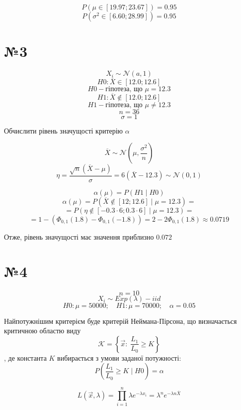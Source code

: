 \documentclass[11pt, a4paper]{article} %
\begin{document}
\begin{mdframed}[style=ans]
    $$P(\mu \in [19.97; 23.67]) = 0.95$$
    $$P(\sigma^2 \in [6.60; 28.99]) = 0.95$$
\end{mdframed}

\pagebreak

\section*{№3}

\begin{mdframed}
    $$X_i \sim \mathcal N (a,1)$$
    $$H0: \overline X \in [12.0; 12.6]$$
    $$H0 - \text{гіпотеза, що } \mu = 12.3$$
    $$H1: \overline X \notin [12.0; 12.6]$$
    $$H1 - \text{гіпотеза, що } \mu \ne 12.3$$
    $$n = 36$$
    $$\sigma = 1$$

    Обчислити рівень значущості критерію $\alpha$
\end{mdframed}

$$\overline X \sim \mathcal{N}(\mu, \frac{\sigma^2}{n})$$
$$\eta = \frac{\sqrt n (\overline X - \mu)}{\sigma} = 6(\overline X - 12.3) \sim \mathcal{N}(0,1)$$

$$\alpha(\mu) = P(H1 \;|\; H0)$$
$$\alpha(\mu) = P(\overline X \notin [12; 12.6] \; | \; \mu = 12.3) = $$
$$= P(\eta \notin [-0.3\cdot 6; 0.3 \cdot 6] \;|\; \mu = 12.3) = $$
$$= 1-\left(\Phi_{0,1}(1.8)-\Phi_{0,1}(-1.8)\right) = 2 - 2\Phi_{0,1}(1.8) \approx 0.0719$$

\begin{mdframed}[style=ans]
    Отже, рівень значущості має значення приблизно $0.072$
\end{mdframed}


\section*{№4}
\begin{mdframed}
    $$n = 10$$
    $$X_i \sim Exp(\lambda) - iid$$
    $$H0: \mu = 50000;\quad H1: \mu = 70000;\quad \alpha=0.05$$
\end{mdframed}

Найпотужнішим критерієм буде критерій Неймана-Пірсона, що визначається критичною областю виду 
$$\mathcal K = \left\{ \vec x :\; \frac{L_1}{L_0} \ge K \right\}$$
, де константа $K$ вибирається з умови заданої потужності:
$$P(\frac{L_1}{L_0} \ge K \;|\; H0) = \alpha$$

$$L(\vec x, \lambda) = \prod_{i=1}^n \lambda e^{-\lambda x_i} = \lambda^n e^{-\lambda n \overline X }$$
\end{document}
